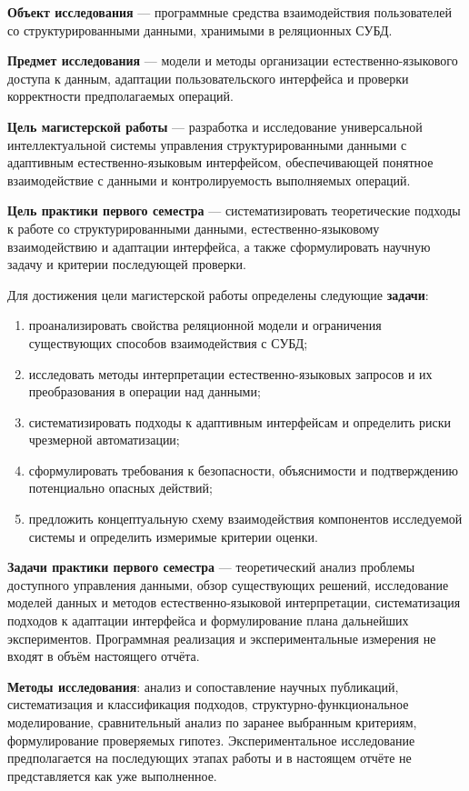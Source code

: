 \textbf{Объект исследования} — программные средства взаимодействия пользователей со структурированными данными, хранимыми в реляционных СУБД.

\textbf{Предмет исследования} — модели и методы организации естественно-языкового доступа к данным, адаптации пользовательского интерфейса и проверки корректности предполагаемых операций.

\textbf{Цель магистерской работы} — разработка и исследование универсальной интеллектуальной системы управления структурированными данными с адаптивным естественно-языковым интерфейсом, обеспечивающей понятное взаимодействие с данными и контролируемость выполняемых операций.

\textbf{Цель практики первого семестра} — систематизировать теоретические подходы к работе со структурированными данными, естественно-языковому взаимодействию и адаптации интерфейса, а также сформулировать научную задачу и критерии последующей проверки.

Для достижения цели магистерской работы определены следующие \textbf{задачи}:
\begin{enumerate}
\item проанализировать свойства реляционной модели и ограничения существующих способов взаимодействия с СУБД;
\item исследовать методы интерпретации естественно-языковых запросов и их преобразования в операции над данными;
\item систематизировать подходы к адаптивным интерфейсам и определить риски чрезмерной автоматизации;
\item сформулировать требования к безопасности, объяснимости и подтверждению потенциально опасных действий;
\item предложить концептуальную схему взаимодействия компонентов исследуемой системы и определить измеримые критерии оценки.
\end{enumerate}

\textbf{Задачи практики первого семестра} — теоретический анализ проблемы доступного управления данными, обзор существующих решений, исследование моделей данных и методов естественно-языковой интерпретации, систематизация подходов к адаптации интерфейса и формулирование плана дальнейших экспериментов. Программная реализация и экспериментальные измерения не входят в объём настоящего отчёта.

\textbf{Методы исследования}: анализ и сопоставление научных публикаций, систематизация и классификация подходов, структурно-функциональное моделирование, сравнительный анализ по заранее выбранным критериям, формулирование проверяемых гипотез. Экспериментальное исследование предполагается на последующих этапах работы и в настоящем отчёте не представляется как уже выполненное.

